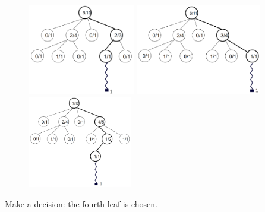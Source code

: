 \begin{figure}[H]
\centering
	\begin{minipage}[b]{0.33\linewidth}
	\centering
		\includegraphics[height=4cm]{3Algorithms/3.2Algorithm_MCTS_Benoit/img/10.png}
	\end{minipage}%
	\begin{minipage}[b]{0.33\linewidth}
	\centering
		\includegraphics[height=4cm]{3Algorithms/3.2Algorithm_MCTS_Benoit/img/11.png}
	\end{minipage}%
	\begin{minipage}[b]{0.33\linewidth}
	\centering
		\includegraphics[height=4cm]{3Algorithms/3.2Algorithm_MCTS_Benoit/img/12.png}
	\end{minipage}%
\end{figure}

Make a decision: the fourth leaf is chosen.\\
\newpage
